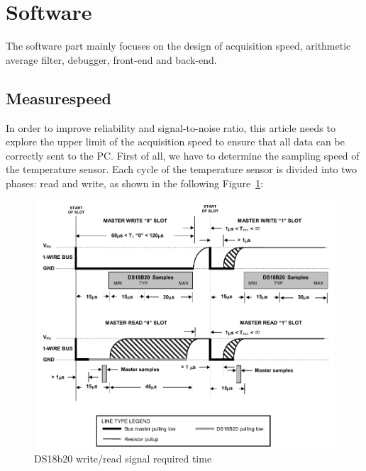 \section{Software}
\label{sec:Software}
The software part mainly focuses on the design of acquisition speed, arithmetic average filter, debugger, front-end and back-end.

\subsection{Measurespeed}
\label{sec:Measurespeed}
In order to improve reliability and signal-to-noise ratio, this article needs to explore the upper limit of the acquisition speed to ensure that all data can be correctly sent to the PC.
First of all, we have to determine the sampling speed of the temperature sensor. Each cycle of the temperature sensor is divided into two phases: read and write, as shown in the following Figure~\ref{fig:5.5}:
\begin{figure}[!ht]
	\centering
	\includegraphics[width=16cm]{grafiken/5.5.pdf}
	\caption{DS18b20 write/read signal required time} 
	\label{fig:5.5}
\end{figure}
\FloatBarrier

